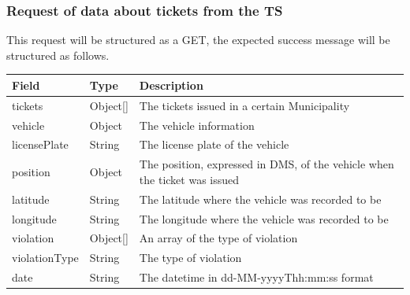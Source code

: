 				\subsubsection{Request of data about tickets from the TS}
					This request will be structured as a GET, the expected success message will be structured as follows.
					\begin{table}[!h]
						\begin{tabular}{L{0.22\textwidth}L{0.15\textwidth}L{0.43\textwidth}}
							\toprule
							\textbf{Field} & \textbf{Type} & \textbf{Description} \\
							\midrule
							tickets & Object[] & The tickets issued in a certain Municipality \\
							\hspace{2.5mm}vehicle & Object & The vehicle information \\
							\hspace{5mm}licensePlate & String & The license plate of the vehicle \\
							\hspace{2.5mm}position & Object & The position, expressed in DMS, of the vehicle when the ticket was issued  \\
							\hspace{5mm}latitude & String & The latitude where the vehicle was recorded to be \\
							\hspace{5mm}longitude & String & The longitude where the vehicle was recorded to be \\
							\hspace{2.5mm}violation & Object[] & An array of the type of violation \\
							\hspace{5mm}violationType & String & The type of violation \\
							\hspace{2.5mm}date & String & The datetime in \newline dd-MM-yyyyThh:mm:ss format \\								 	\bottomrule
								\end{tabular}
							\end{table}
